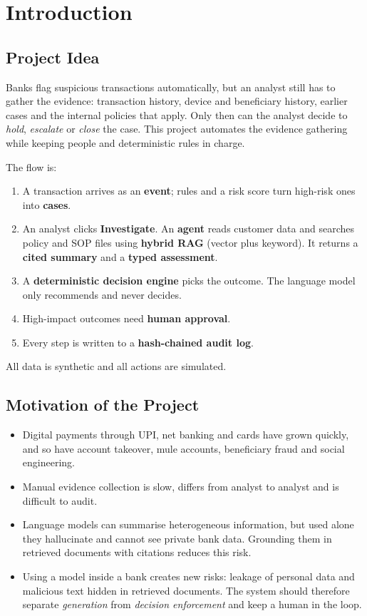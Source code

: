 \documentclass[oneside,a4paper,12pt]{report}
\begin{document}
\chapter{Introduction}

\section{Project Idea}
Banks flag suspicious transactions automatically, but an analyst still has to gather the evidence: transaction history, device and beneficiary history, earlier cases and the internal policies that apply. Only then can the analyst decide to \emph{hold}, \emph{escalate} or \emph{close} the case. This project automates the evidence gathering while keeping people and deterministic rules in charge.

The flow is:
\begin{enumerate}
  \item A transaction arrives as an \textbf{event}; rules and a risk score turn high-risk ones into \textbf{cases}.
  \item An analyst clicks \textbf{Investigate}. An \textbf{agent} reads customer data and searches policy and SOP files using \textbf{hybrid RAG} (vector plus keyword). It returns a \textbf{cited summary} and a \textbf{typed assessment}.
  \item A \textbf{deterministic decision engine} picks the outcome. The language model only recommends and never decides.
  \item High-impact outcomes need \textbf{human approval}.
  \item Every step is written to a \textbf{hash-chained audit log}.
\end{enumerate}
All data is synthetic and all actions are simulated.

\section{Motivation of the Project}
\begin{itemize}
  \item Digital payments through UPI, net banking and cards have grown quickly, and so have account takeover, mule accounts, beneficiary fraud and social engineering.
  \item Manual evidence collection is slow, differs from analyst to analyst and is difficult to audit.
  \item Language models can summarise heterogeneous information, but used alone they hallucinate and cannot see private bank data. Grounding them in retrieved documents with citations reduces this risk.
  \item Using a model inside a bank creates new risks: leakage of personal data and malicious text hidden in retrieved documents. The system should therefore separate \emph{generation} from \emph{decision enforcement} and keep a human in the loop.
\end{itemize}
\end{document}
